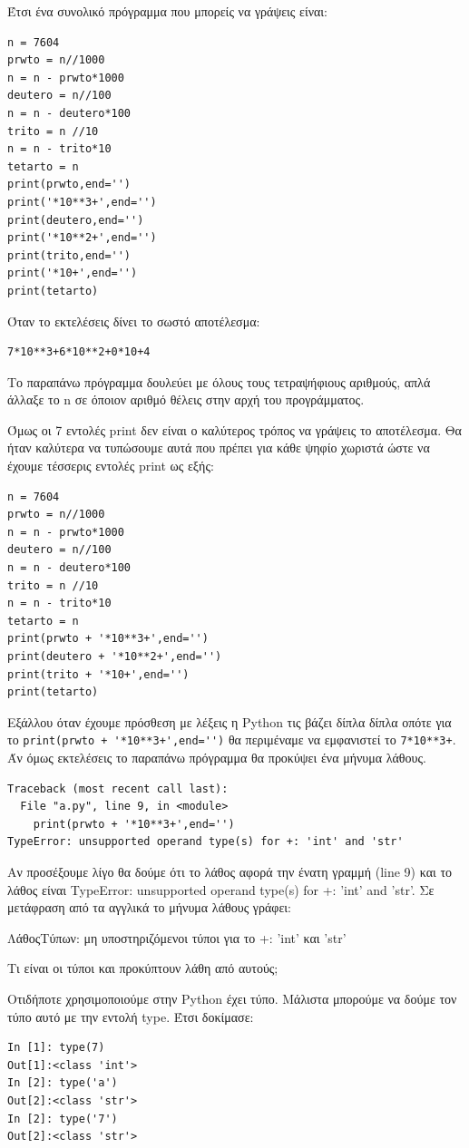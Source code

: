 Έτσι ένα συνολικό πρόγραμμα που μπορείς να γράψεις είναι:
\begin{lstlisting}
n = 7604
prwto = n//1000
n = n - prwto*1000
deutero = n//100
n = n - deutero*100
trito = n //10
n = n - trito*10
tetarto = n
print(prwto,end='')
print('*10**3+',end='')
print(deutero,end='')
print('*10**2+',end='')
print(trito,end='')
print('*10+',end='')
print(tetarto)
\end{lstlisting}
Όταν το εκτελέσεις δίνει το σωστό αποτέλεσμα:
\begin{lstlisting}
7*10**3+6*10**2+0*10+4
\end{lstlisting}

Το παραπάνω πρόγραμμα δουλεύει με όλους τους τετραψήφιους αριθμούς, απλά άλλαξε το n σε όποιον αριθμό θέλεις στην αρχή του προγράμματος.

Όμως οι 7 εντολές print δεν είναι ο καλύτερος τρόπος να γράψεις το αποτέλεσμα. Θα ήταν καλύτερα να τυπώσουμε αυτά που πρέπει για κάθε ψηφίο χωριστά ώστε να έχουμε τέσσερις εντολές print ως εξής:
\begin{lstlisting}
n = 7604
prwto = n//1000
n = n - prwto*1000
deutero = n//100
n = n - deutero*100
trito = n //10
n = n - trito*10
tetarto = n
print(prwto + '*10**3+',end='')
print(deutero + '*10**2+',end='')
print(trito + '*10+',end='')
print(tetarto)
\end{lstlisting}

Εξάλλου όταν έχουμε πρόσθεση με λέξεις η Python τις βάζει δίπλα δίπλα οπότε για το \lstinline{print(prwto + '*10**3+',end='')}
θα περιμέναμε να εμφανιστεί το \lstinline{7*10**3+}. 
Άν όμως εκτελέσεις το παραπάνω πρόγραμμα θα προκύψει ένα μήνυμα λάθους.
\begin{lstlisting}
Traceback (most recent call last):
  File "a.py", line 9, in <module>
    print(prwto + '*10**3+',end='')
TypeError: unsupported operand type(s) for +: 'int' and 'str'
\end{lstlisting}
Αν προσέξουμε λίγο θα δούμε ότι το λάθος αφορά την ένατη γραμμή (line 9) και το λάθος είναι TypeError: unsupported operand type(s) for +: 'int' and 'str'.
Σε μετάφραση από τα αγγλικά το μήνυμα λάθους γράφει:

ΛάθοςΤύπων: μη υποστηριζόμενοι τύποι για το +: 'int' και 'str'

Τι είναι οι τύποι και προκύπτουν λάθη από αυτούς;

Οτιδήποτε χρησιμοποιούμε στην Python έχει τύπο. Μάλιστα μπορούμε να δούμε τον τύπο αυτό με την εντολή type. Έτσι δοκίμασε:
\begin{lstlisting}
In [1]: type(7)
Out[1]:<class 'int'>
In [2]: type('a')
Out[2]:<class 'str'>
In [2]: type('7')
Out[2]:<class 'str'>
\end{lstlisting} 

